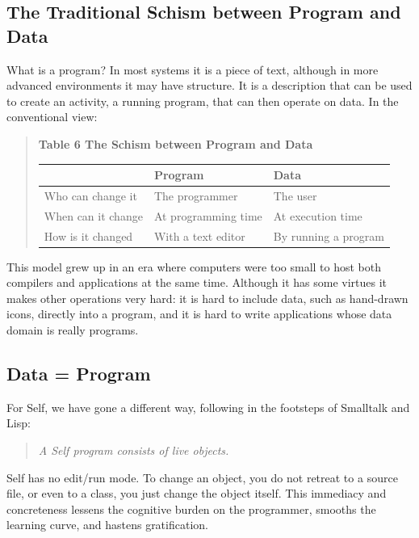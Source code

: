 \documentclass[letterpaper,10pt,english]{sphinxmanual}
\begin{document}
\subsection{The Traditional Schism between Program and Data}
\label{howtoprg:the-traditional-schism-between-program-and-data}
What is a program? In most systems it is a piece of text, although in more advanced environments
it may have structure. It is a description that can be used to create an activity, a running program,
that can then operate on data. In the conventional view:
\begin{quote}

\textbf{Table 6 The Schism between Program and Data}

\begin{tabulary}{\linewidth}{|L|L|L|}
\hline
\textbf{} & \textbf{
Program
} & \textbf{
Data
}\\\hline

Who can change it
 & 
The programmer
 & 
The user
\\\hline

When can it change
 & 
At programming time
 & 
At execution time
\\\hline

How is it changed
 & 
With a text editor
 & 
By running a program
\\\hline
\end{tabulary}

\end{quote}

This model grew up in an era where computers were too small to host both compilers and applications
at the same time. Although it has some virtues it makes other operations very hard: it is hard
to include data, such as hand-drawn icons, directly into a program, and it is hard to write applications
whose data domain is really programs.


\subsection{Data = Program}
\label{howtoprg:data-program}
For Self, we have gone a different way, following in the footsteps of Smalltalk and Lisp:
\begin{quote}

\emph{A Self program consists of live objects.}
\end{quote}

Self has no edit/run mode. To change an object, you do not retreat to a source file, or even to a class,
you just change the object itself. This immediacy and concreteness lessens the cognitive burden on
the programmer, smooths the learning curve, and hastens gratification.
\end{document}
